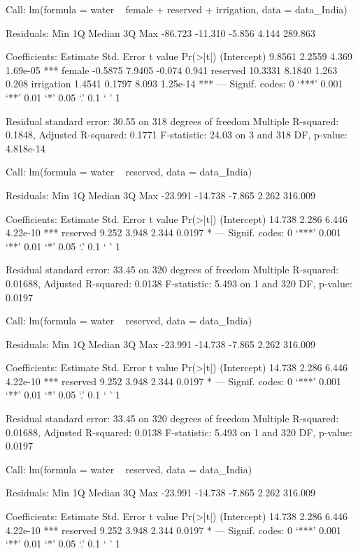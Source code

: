 
Call:
lm(formula = water ~ female + reserved + irrigation, data = data_India)

Residuals:
    Min      1Q  Median      3Q     Max 
-86.723 -11.310  -5.856   4.144 289.863 

Coefficients:
            Estimate Std. Error t value Pr(>|t|)    
(Intercept)   9.8561     2.2559   4.369 1.69e-05 ***
female       -0.5875     7.9405  -0.074    0.941    
reserved     10.3331     8.1840   1.263    0.208    
irrigation    1.4541     0.1797   8.093 1.25e-14 ***
---
Signif. codes:  0 ‘***’ 0.001 ‘**’ 0.01 ‘*’ 0.05 ‘.’ 0.1 ‘ ’ 1

Residual standard error: 30.55 on 318 degrees of freedom
Multiple R-squared:  0.1848,	Adjusted R-squared:  0.1771 
F-statistic: 24.03 on 3 and 318 DF,  p-value: 4.818e-14


Call:
lm(formula = water ~ reserved, data = data_India)

Residuals:
    Min      1Q  Median      3Q     Max 
-23.991 -14.738  -7.865   2.262 316.009 

Coefficients:
            Estimate Std. Error t value Pr(>|t|)    
(Intercept)   14.738      2.286   6.446 4.22e-10 ***
reserved       9.252      3.948   2.344   0.0197 *  
---
Signif. codes:  0 ‘***’ 0.001 ‘**’ 0.01 ‘*’ 0.05 ‘.’ 0.1 ‘ ’ 1

Residual standard error: 33.45 on 320 degrees of freedom
Multiple R-squared:  0.01688,	Adjusted R-squared:  0.0138 
F-statistic: 5.493 on 1 and 320 DF,  p-value: 0.0197


Call:
lm(formula = water ~ reserved, data = data_India)

Residuals:
    Min      1Q  Median      3Q     Max 
-23.991 -14.738  -7.865   2.262 316.009 

Coefficients:
            Estimate Std. Error t value Pr(>|t|)    
(Intercept)   14.738      2.286   6.446 4.22e-10 ***
reserved       9.252      3.948   2.344   0.0197 *  
---
Signif. codes:  0 ‘***’ 0.001 ‘**’ 0.01 ‘*’ 0.05 ‘.’ 0.1 ‘ ’ 1

Residual standard error: 33.45 on 320 degrees of freedom
Multiple R-squared:  0.01688,	Adjusted R-squared:  0.0138 
F-statistic: 5.493 on 1 and 320 DF,  p-value: 0.0197


Call:
lm(formula = water ~ reserved, data = data_India)

Residuals:
    Min      1Q  Median      3Q     Max 
-23.991 -14.738  -7.865   2.262 316.009 

Coefficients:
            Estimate Std. Error t value Pr(>|t|)    
(Intercept)   14.738      2.286   6.446 4.22e-10 ***
reserved       9.252      3.948   2.344   0.0197 *  
---
Signif. codes:  0 ‘***’ 0.001 ‘**’ 0.01 ‘*’ 0.05 ‘.’ 0.1 ‘ ’ 1

